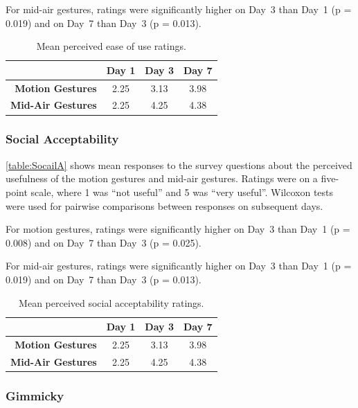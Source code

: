 \documentclass{l4proj}
\begin{document}
For mid-air gestures, ratings were significantly higher on Day~3 than Day~1 (p = 0.019) and on Day~7 than Day~3 (p = 0.013).

\begin{table}
\centering
\begin{tabular}{r c c c}
                              & \textbf{Day 1} & \textbf{Day 3} & \textbf{Day 7} \\ \toprule
    \textbf{Motion Gestures}  & 2.25           & 3.13           & 3.98  \\
    \textbf{Mid-Air Gestures} & 2.25           & 4.25           & 4.38 \\ \bottomrule
\end{tabular}
\caption{Mean perceived ease of use ratings.}
\label{table:Ease}
\end{table}

\subsubsection{Social Acceptability}

\autoref{table:SocailA} shows mean responses to the survey questions about the perceived usefulness of the motion gestures and mid-air gestures. Ratings were on a five-point scale, where 1 was ``not useful'' and 5 was ``very useful''. Wilcoxon tests were used for pairwise comparisons between responses on subsequent days.

For motion gestures, ratings were significantly higher on Day~3 than Day~1 (p = 0.008) and on Day~7 than Day~3 (p = 0.025).

For mid-air gestures, ratings were significantly higher on Day~3 than Day~1 (p = 0.019) and on Day~7 than Day~3 (p = 0.013).

\begin{table}
\centering
\begin{tabular}{r c c c}
                              & \textbf{Day 1} & \textbf{Day 3} & \textbf{Day 7} \\ \toprule
    \textbf{Motion Gestures}  & 2.25           & 3.13           & 3.98  \\
    \textbf{Mid-Air Gestures} & 2.25           & 4.25           & 4.38 \\ \bottomrule
\end{tabular}
\caption{Mean perceived social acceptability ratings.}
\label{table:SocailA}
\end{table}

\subsubsection{Gimmicky}
\end{document}

